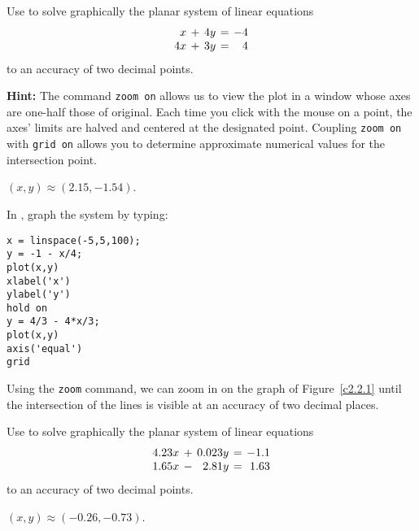 \documentclass{ximera}
\begin{document}
\begin{exercise} \label{c2.2.1}
Use \Matlab to solve graphically the planar system of linear
equations
\[
\arraycolsep 2pt
\begin{array}{rcrcr}
 x & + & 4y & = & -4 \\
4x & + & 3y & = &  4
\end{array}
\]
to an accuracy of two decimal points.

{\bf Hint:} The \Matlab command {\tt zoom on}
allows us to
view the plot in a window whose axes are one-half those of
original.  Each time you click with the mouse on a point,
the axes' limits are halved and centered at the designated
point. Coupling {\tt zoom on} with {\tt grid on} allows you
to determine approximate numerical values for the intersection
point.

\begin{solution}

\ans $(x,y) \approx (2.15,-1.54)$.

\soln In \Matlab, graph the system by typing:
\begin{verbatim}
x = linspace(-5,5,100);
y = -1 - x/4;
plot(x,y)
xlabel('x')
ylabel('y')
hold on
y = 4/3 - 4*x/3;
plot(x,y)
axis('equal')
grid
\end{verbatim}

Using the {\tt zoom} command, we can zoom in on the graph of
Figure~\ref{c2.2.1} until the intersection of the lines is
visible at an accuracy of two decimal places.  

\begin{figure}[htb]
                       \centerline{%
                       }
\end{figure}

\end{solution}
\end{exercise}

\begin{exercise} \label{c2.2.2}
Use \Matlab to solve graphically the planar system of linear
equations
\[
\arraycolsep 2pt
\begin{array}{rcrcr}
4.23x & + & 0.023y & = & -1.1 \\
1.65x & - & 2.81y & = &  1.63
\end{array}
\]
to an accuracy of two decimal points.

\begin{solution}

$(x,y) \approx (-0.26,-0.73)$.


\end{solution}
\end{exercise}
\end{document}
